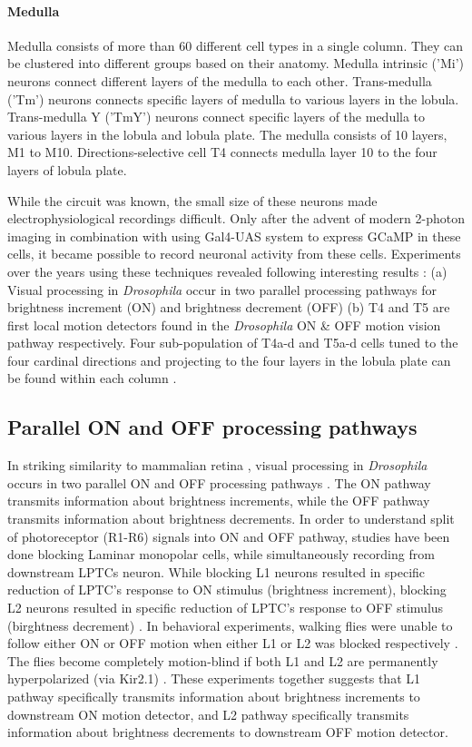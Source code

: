 \paragraph{Medulla}
Medulla consists of more than 60 different cell types in a single column. They can be clustered into different groups based on their anatomy. Medulla intrinsic ('Mi') neurons connect different layers of the medulla to each other. Trans-medulla ('Tm') neurons connects specific layers of medulla to various layers in the lobula. Trans-medulla Y ('TmY') neurons connect specific layers of the medulla to various layers in the lobula and lobula plate. The medulla consists of 10 layers, M1 to M10. Directions-selective cell T4 connects medulla layer 10 to the four layers of lobula plate.

While the circuit was known, the small size of these neurons made electrophysiological recordings difficult. Only after the advent of modern 2-photon imaging in combination with using Gal4-UAS system to express GCaMP in these cells, it became possible to record neuronal activity from these cells. Experiments over the years using these techniques revealed following interesting results : (a) Visual processing in \textit{Drosophila} occur in two parallel processing pathways for brightness increment (ON) and brightness decrement (OFF) \parencite{Joesch2010, Joesch2013, Strother2014, Eichner2011, Behnia2014} (b) T4 and T5 are first local motion detectors found in the \textit{Drosophila} ON \& OFF motion vision pathway respectively. Four sub-population of T4a-d and T5a-d cells tuned to the four cardinal directions and projecting to the four layers in the lobula plate can be found within each column \parencite{Maisak2013}. 


\subsection{Parallel ON and OFF processing pathways}
In striking similarity to mammalian retina \parencite{Masland2012}, visual processing in \textit{Drosophila} occurs in two parallel ON and OFF processing pathways \parencite{Borst2015}. The ON pathway transmits information about brightness increments, while the OFF pathway transmits information about brightness decrements. In order to understand split of photoreceptor (R1-R6) signals into ON and OFF pathway, studies have been done blocking Laminar monopolar cells, while simultaneously recording from downstream LPTCs neuron. While blocking L1 neurons resulted in specific reduction of LPTC's response to ON stimulus (brightness increment), blocking L2 neurons resulted in specific reduction of LPTC's response to OFF stimulus (birghtness decrement) \parencite{Joesch2010}. In behavioral experiments, walking flies were unable to follow either ON or OFF motion when either L1 or L2 was blocked respectively \parencite{Clark2011, Maisak2013}. The flies become completely motion-blind if both L1 and L2 are permanently hyperpolarized (via Kir2.1) \parencite{Tuthill2013, Bahl2013}. These experiments together suggests that L1 pathway specifically transmits information about brightness increments to downstream ON motion detector, and L2 pathway specifically transmits information about brightness decrements to downstream OFF motion detector. 

